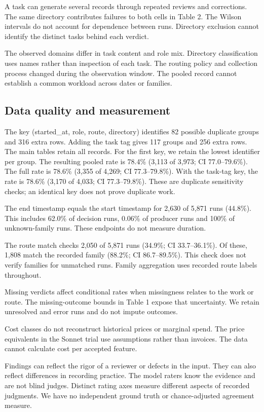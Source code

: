 \documentclass[
  10pt,
  a4paper,
]{article}
\begin{document}
A task can generate several records through repeated reviews and
corrections. The same directory contributes failures to both cells in
Table 2. The Wilson intervals do not account for dependence between
runs. Directory exclusion cannot identify the distinct tasks behind each
verdict.

The observed domains differ in task content and role mix. Directory
classification uses names rather than inspection of each task. The
routing policy and collection process changed during the observation
window. The pooled record cannot establish a common workload across
dates or families.

\subsection{Data quality and
measurement}\label{data-quality-and-measurement}

The key (started\_at, role, route, directory) identifies 82 possible
duplicate groups and 316 extra rows. Adding the task tag gives 117
groups and 256 extra rows. The main tables retain all records. For the
first key, we retain the lowest identifier per group. The resulting
pooled rate is 78.4\% (3,113 of 3,973; CI 77.0--79.6\%). The full rate
is 78.6\% (3,355 of 4,269; CI 77.3--79.8\%). With the task-tag key, the
rate is 78.6\% (3,170 of 4,033; CI 77.3--79.8\%). These are duplicate
sensitivity checks; an identical key does not prove duplicate work.

The end timestamp equals the start timestamp for 2,630 of 5,871 runs
(44.8\%). This includes 62.0\% of decision runs, 0.06\% of producer runs
and 100\% of unknown-family runs. These endpoints do not measure
duration.

The route match checks 2,050 of 5,871 runs (34.9\%; CI 33.7--36.1\%). Of
these, 1,808 match the recorded family (88.2\%; CI 86.7--89.5\%). This
check does not verify families for unmatched runs. Family aggregation
uses recorded route labels throughout.

Missing verdicts affect conditional rates when missingness relates to
the work or route. The missing-outcome bounds in Table 1 expose that
uncertainty. We retain unresolved and error runs and do not impute
outcomes.

Cost classes do not reconstruct historical prices or marginal spend. The
price equivalents in the Sonnet trial use assumptions rather than
invoices. The data cannot calculate cost per accepted feature.

Findings can reflect the rigor of a reviewer or defects in the input.
They can also reflect differences in recording practice. The model
raters know the evidence and are not blind judges. Distinct rating axes
measure different aspects of recorded judgments. We have no independent
ground truth or chance-adjusted agreement measure.
\end{document}

